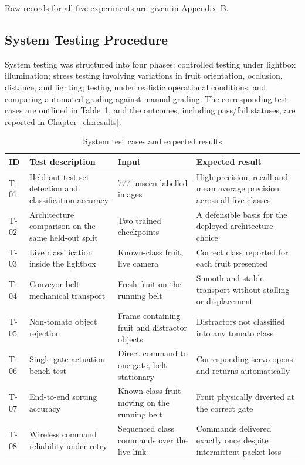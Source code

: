 Raw records for all five experiments are given in \hyperref[app:B]{Appendix~B}.

\subsection{System Testing Procedure}
\label{sec:m_testing}

System testing was structured into four phases: controlled testing under lightbox illumination; stress testing involving variations in fruit orientation, occlusion, distance, and lighting; testing under realistic operational conditions; and comparing automated grading against manual grading. The corresponding test cases are outlined in Table~\ref{tab:testcases}, and the outcomes, including pass/fail statuses, are reported in Chapter~\ref{ch:results}.

\begin{table}[H]
\caption{System test cases and expected results}
\label{tab:testcases}
\centering
\begin{tabularx}{\textwidth}{l p{4.0cm} p{3.2cm} X}
\toprule
\textbf{ID} & \textbf{Test description} & \textbf{Input} & \textbf{Expected result} \\
\midrule
T-01 & Held-out test set detection and classification accuracy & 777 unseen labelled images & High precision, recall and mean average precision across all five classes \\
T-02 & Architecture comparison on the same held-out split & Two trained checkpoints & A defensible basis for the deployed architecture choice \\
T-03 & Live classification inside the lightbox & Known-class fruit, live camera & Correct class reported for each fruit presented \\
T-04 & Conveyor belt mechanical transport & Fresh fruit on the running belt & Smooth and stable transport without stalling or displacement \\
T-05 & Non-tomato object rejection & Frame containing fruit and distractor objects & Distractors not classified into any tomato class \\
T-06 & Single gate actuation bench test & Direct command to one gate, belt stationary & Corresponding servo opens and returns automatically \\
T-07 & End-to-end sorting accuracy & Known-class fruit moving on the running belt & Fruit physically diverted at the correct gate \\
T-08 & Wireless command reliability under retry & Sequenced class commands over the live link & Commands delivered exactly once despite intermittent packet loss \\
\bottomrule
\end{tabularx}
\end{table}

